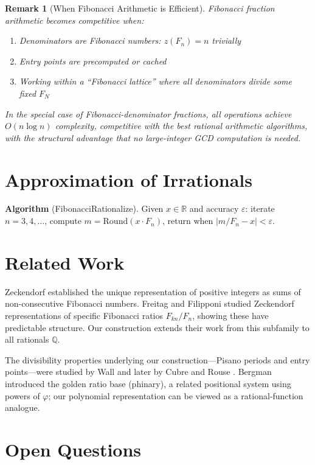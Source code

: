 \documentclass[11pt]{article}
\newtheorem{remark}[theorem]{Remark}
\begin{document}
\begin{remark}[When Fibonacci Arithmetic is Efficient]
Fibonacci fraction arithmetic becomes competitive when:
\begin{enumerate}
    \item Denominators are Fibonacci numbers: $z(F_n) = n$ trivially
    \item Entry points are precomputed or cached
    \item Working within a ``Fibonacci lattice'' where all denominators divide some fixed $F_N$
\end{enumerate}
In the special case of Fibonacci-denominator fractions, all operations achieve $O(n \log n)$ complexity, competitive with the best rational arithmetic algorithms, with the structural advantage that no large-integer GCD computation is needed.
\end{remark}

\section{Approximation of Irrationals}

\textbf{Algorithm} (FibonacciRationalize). Given $x \in \mathbb{R}$ and accuracy $\varepsilon$: iterate $n = 3, 4, \ldots$, compute $m = \mathrm{Round}(x \cdot F_n)$, return when $|m/F_n - x| < \varepsilon$.

\section{Related Work}

Zeckendorf \cite{zeckendorf1972} established the unique representation of positive integers as sums of non-consecutive Fibonacci numbers. Freitag and Filipponi \cite{freitag1990,filipponi1993} studied Zeckendorf representations of specific Fibonacci ratios $F_{kn}/F_n$, showing these have predictable structure. Our construction extends their work from this subfamily to all rationals $\mathbb{Q}$.

The divisibility properties underlying our construction---Pisano periods and entry points---were studied by Wall \cite{wall1960} and later by Cubre and Rouse \cite{cubre2012}. Bergman \cite{bergman1957} introduced the golden ratio base (phinary), a related positional system using powers of $\varphi$; our polynomial representation can be viewed as a rational-function analogue.

\section{Open Questions}
\end{document}
